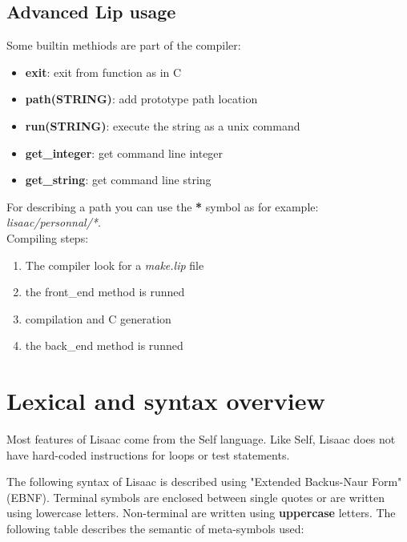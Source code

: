 \documentclass[11pt]{mybook}
\begin{document}
\subsection{Advanced Lip usage}

Some builtin methiods are part of the compiler:

\begin{itemize}
\item \textbf{exit}: exit from function as in C
\item \textbf{path(STRING)}: add prototype path location
\item \textbf{run(STRING)}: execute the string as a unix command
\item \textbf{get\_integer}: get command line integer
\item \textbf{get\_string}: get command line string\\
\end{itemize}

For describing a path you can use the \textbf{*} symbol as for example:
\textit{lisaac/personnal/*}.\\

\noindent{}Compiling steps:

\begin{enumerate}
\item The compiler look for a \textit{make.lip} file
\item the front\_end method is runned
\item compilation and C generation
\item the back\_end method is runned
\end{enumerate}


\section{Lexical and syntax overview}
\label{language_reference:lexical_syntax}
%
Most features of Lisaac come from the Self language.
Like Self, Lisaac does not have hard-coded instructions for loops
or test statements.

The following syntax of Lisaac is described using 
"Extended Backus-Naur Form" (EBNF).
Terminal symbols are enclosed between single quotes or are written using 
lowercase letters. 
Non-terminal are written using {\bf{}uppercase} letters.
The following table describes the semantic of meta-symbols
used:
\end{document}
